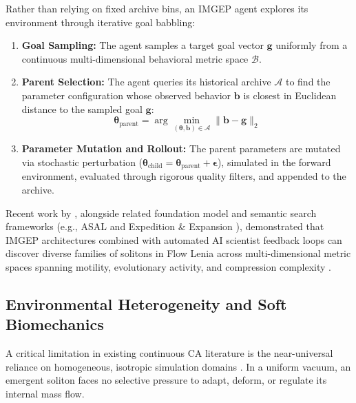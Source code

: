 Rather than relying on fixed archive bins, an IMGEP agent explores its environment through iterative goal babbling:
\begin{enumerate}
    \item \textbf{Goal Sampling:} The agent samples a target goal vector $\mathbf{g}$ uniformly from a continuous multi-dimensional behavioral metric space $\mathcal{B}$.
    \item \textbf{Parent Selection:} The agent queries its historical archive $\mathcal{A}$ to find the parameter configuration whose observed behavior $\mathbf{b}$ is closest in Euclidean distance to the sampled goal $\mathbf{g}$:
    \begin{equation}
    \boldsymbol{\theta}_{\text{parent}} = \arg\min_{(\boldsymbol{\theta}, \mathbf{b}) \in \mathcal{A}} \|\mathbf{b} - \mathbf{g}\|_2
    \label{eq:bg_imgep_parent}
    \end{equation}
    \item \textbf{Parameter Mutation and Rollout:} The parent parameters are mutated via stochastic perturbation ($\boldsymbol{\theta}_{\text{child}} = \boldsymbol{\theta}_{\text{parent}} + \boldsymbol{\epsilon}$), simulated in the forward environment, evaluated through rigorous quality filters, and appended to the archive.
\end{enumerate}

Recent work by \textcite{michel2025exploring}, alongside related foundation model and semantic search frameworks (e.g., ASAL \parencite{kumar2025asal} and Expedition \& Expansion \parencite{khajehabdollahi2025expedition}), demonstrated that IMGEP architectures combined with automated AI scientist feedback loops can discover diverse families of solitons in Flow Lenia across multi-dimensional metric spaces spanning motility, evolutionary activity, and compression complexity \parencite{cisneros2019evolving}.

\subsection{Environmental Heterogeneity and Soft Biomechanics}
\label{subsec:bg_heterogeneity_biomechanics}

A critical limitation in existing continuous CA literature is the near-universal reliance on homogeneous, isotropic simulation domains \parencite{chan2019lenia, plantec2025flowlenia}. In a uniform vacuum, an emergent soliton faces no selective pressure to adapt, deform, or regulate its internal mass flow.

